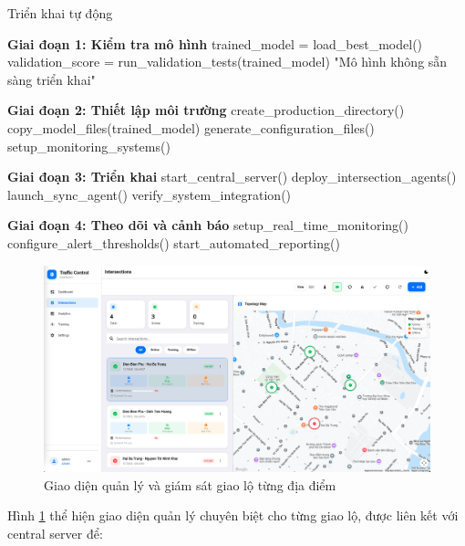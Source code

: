 \begin{algorithm}[!htp]
    \caption{Triển khai tự động}
    \begin{algorithmic}[1]
        \State \textbf{Giai đoạn 1: Kiểm tra mô hình}
        \State trained\_model = load\_best\_model()
        \State validation\_score = run\_validation\_tests(trained\_model)
            \Return "Mô hình không sẵn sàng triển khai"
        \EndIf
        
        \State \textbf{Giai đoạn 2: Thiết lập môi trường}
        \State create\_production\_directory()
        \State copy\_model\_files(trained\_model)
        \State generate\_configuration\_files()
        \State setup\_monitoring\_systems()
        
        \State \textbf{Giai đoạn 3: Triển khai}
        \State start\_central\_server()
        \State deploy\_intersection\_agents()
        \State launch\_sync\_agent()
        \State verify\_system\_integration()
        
        \State \textbf{Giai đoạn 4: Theo dõi và cảnh báo}
        \State setup\_real\_time\_monitoring()
        \State configure\_alert\_thresholds()
        \State start\_automated\_reporting()
    \end{algorithmic}
\end{algorithm}

\begin{figure}[!htp]
    \centering
    \includegraphics[width=\textwidth]{img/intersection_ui.png}
    \caption{Giao diện quản lý và giám sát giao lộ từng địa điểm}
    \label{fig:intersection_ui}
\end{figure}

Hình \ref{fig:intersection_ui} thể hiện giao diện quản lý chuyên biệt cho từng giao lộ, 
được liên kết với central server để:

